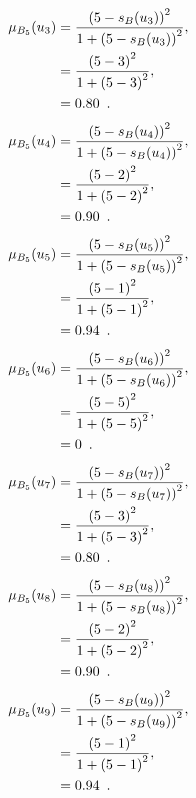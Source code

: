 \documentclass[a4paper,openany]{book}
\begin{document}
				\begin{align}
					\mu_{B_5}(u_3) &= \frac{\left(5-s_B(u_3)\right)^2}{1 + \left(5-s_B(u_3)\right)^2} ,\\
					&= \frac{\left(5-3\right)^2}{1 + \left(5-3\right)^2} \notag ,\\
					&= 0.80 \enspace. \notag
				\end{align}
				\begin{align}
					\mu_{B_5}(u_4) &= \frac{\left(5-s_B(u_4)\right)^2}{1 + \left(5-s_B(u_4)\right)^2} ,\\
					&= \frac{\left(5-2\right)^2}{1 + \left(5-2\right)^2} \notag ,\\
					&= 0.90 \enspace. \notag
				\end{align}
				\begin{align}
					\mu_{B_5}(u_5) &= \frac{\left(5-s_B(u_5)\right)^2}{1 + \left(5-s_B(u_5)\right)^2} ,\\
					&= \frac{\left(5-1\right)^2}{1 + \left(5-1\right)^2} \notag ,\\
					&= 0.94 \enspace. \notag
				\end{align}
				\begin{align}
					\mu_{B_5}(u_6) &= \frac{\left(5-s_B(u_6)\right)^2}{1 + \left(5-s_B(u_6)\right)^2} ,\\
					&= \frac{\left(5-5\right)^2}{1 + \left(5-5\right)^2} \notag ,\\
					&= 0 \enspace. \notag
				\end{align}
				\begin{align}
					\mu_{B_5}(u_7) &= \frac{\left(5-s_B(u_7)\right)^2}{1 + \left(5-s_B(u_7)\right)^2} ,\\
					&= \frac{\left(5-3\right)^2}{1 + \left(5-3\right)^2} \notag ,\\
					&= 0.80 \enspace. \notag
				\end{align}
				\begin{align}
					\mu_{B_5}(u_8) &= \frac{\left(5-s_B(u_8)\right)^2}{1 + \left(5-s_B(u_8)\right)^2} ,\\
					&= \frac{\left(5-2\right)^2}{1 + \left(5-2\right)^2} \notag ,\\
					&= 0.90 \enspace. \notag
				\end{align}
				\begin{align}
					\mu_{B_5}(u_9) &= \frac{\left(5-s_B(u_9)\right)^2}{1 + \left(5-s_B(u_9)\right)^2} ,\\
					&= \frac{\left(5-1\right)^2}{1 + \left(5-1\right)^2} \notag ,\\
					&= 0.94 \enspace. \notag
				\end{align}
\end{document}

